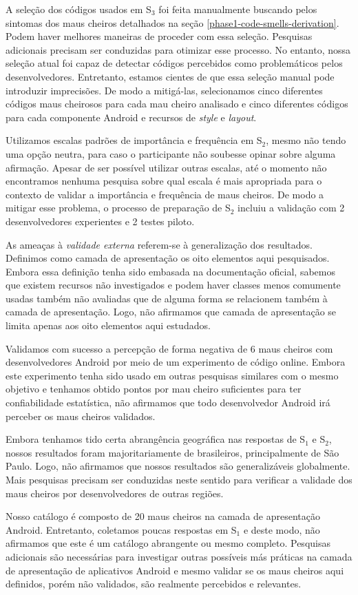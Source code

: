 A seleção dos códigos usados em S$_3$ foi feita manualmente buscando pelos sintomas dos maus cheiros detalhados na seção \ref{phase1-code-smells-derivation}. Podem haver melhores maneiras de proceder com essa seleção. Pesquisas adicionais precisam ser conduzidas para otimizar esse processo. No entanto, nossa seleção atual foi capaz de detectar códigos percebidos como problemáticos pelos desenvolvedores. Entretanto, estamos cientes de que essa seleção manual pode introduzir imprecisões. De modo a mitigá-las, selecionamos cinco diferentes códigos maus cheirosos para cada mau cheiro analisado e cinco diferentes códigos para cada componente Android e recursos de \textit{style} e \textit{layout}. 

Utilizamos escalas padrões de importância e frequência em S$_2$, mesmo não tendo uma opção neutra, para caso o participante não soubesse opinar sobre alguma afirmação. Apesar de ser possível utilizar outras escalas, até o momento não encontramos nenhuma pesquisa sobre qual escala é mais apropriada para o contexto de validar a importância e frequência de maus cheiros. De modo a mitigar esse problema, o processo de preparação de S$_2$ incluiu a validação com 2 desenvolvedores experientes e 2 testes piloto.


As ameaças à \textit{validade externa} referem-se à generalização dos resultados. Definimos como camada de apresentação os oito elementos aqui pesquisados. Embora essa definição tenha sido embasada na documentação oficial, sabemos que existem recursos não investigados e podem haver classes menos comumente usadas também não avaliadas que de alguma forma se relacionem também à camada de apresentação. Logo, não afirmamos que camada de apresentação se limita apenas aos oito elementos aqui estudados.

Validamos com sucesso a percepção de forma negativa de 6 maus cheiros com desenvolvedores Android por meio de um experimento de código online. Embora este experimento tenha sido usado em outras pesquisas similares com o mesmo objetivo \cite{AnicheSmellsMVC:17, MvcSmells:16, Palomba_Do_2014} e tenhamos obtido pontos por mau cheiro suficientes para ter confiabilidade estatística, não afirmamos que todo desenvolvedor Android irá perceber os maus cheiros validados. 

Embora tenhamos tido certa abrangência geográfica nas respostas de S$_1$ e S$_2$, nossos resultados foram majoritariamente de brasileiros, principalmente de São Paulo. Logo, não afirmamos que nossos resultados são generalizáveis globalmente. Mais pesquisas precisam ser conduzidas neste sentido para verificar a validade dos maus cheiros por desenvolvedores de outras regiões. 

Nosso catálogo é composto de 20 maus cheiros na camada de apresentação Android. Entretanto, coletamos poucas respostas em S$_1$ e deste modo, não afirmamos que este é um catálogo abrangente ou mesmo completo. Pesquisas adicionais são necessárias para investigar outras possíveis más práticas na camada de apresentação de aplicativos Android e mesmo validar se os maus cheiros aqui definidos, porém não validados, são realmente percebidos e relevantes. 

